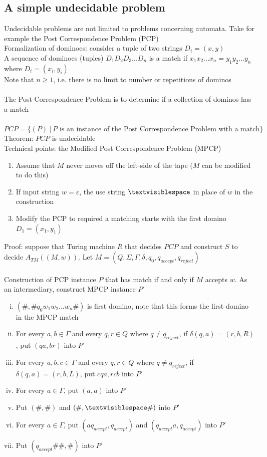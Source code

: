 \documentclass{article}
\newcommand{\tmblank}{\textvisiblespace}
\newcommand*{\<}{\langle}
\renewcommand*{\>}{\rangle}
\begin{document}
		\subsection{A simple undecidable problem}
			Undecidable problems are not limited to problems concerning automata. Take for example the Post Correspondence Problem (PCP) \\
			Formalization of dominoes: consider a tuple of two strings $D_i = (x, y)$ \\
			A sequence of dominoes (tuples) $D_1D_2D_3...D_n$ is a match if $x_1x_2...x_n = y_1y_2...y_n$ where $D_i = (x_i, y_i)$ \\
			Note that $n \geq 1$, i.e. there is no limit to number or repetitions of dominos \\
			\\
			The Post Correspondence Problem is to determine if a collection of dominos has a match \\
			\\
			$PCP = \{(P)\:|\:P\text{ is an instance of the Post Correspondence Problem with a match}\}$ \\
			Theorem: $PCP$ is undecidable \\
			Technical points: the Modified Post Correspondence Problem (MPCP) 
			\begin{enumerate}
				\item Assume that $M$ never moves off the left-side of the tape ($M$ can be modified to do this)
				\item If input string $w = \varepsilon$, the use string $\tmblank$ in place of $w$ in the construction
				\item Modify the PCP to required a matching starts with the first domino $D_1 = (x_1, y_1)$
				\end{enumerate}
			Proof: suppose that Turing machine $R$ that decides $PCP$ and construct $S$ to decide $A_{TM}((M, w))$. Let $M = (Q, \Sigma, \Gamma, \delta, q_0, q_{accept}, q_{reject})$ \\
			\\
			Construction of PCP instance $P$ that has match if and only if $M$ accepts $w$. As an intermediary, construct MPCP instance $P'$
			\begin{enumerate}[(i)]
				\item $(\#, \#q_0w_1w_2...w_n\#)$ is first domino, note that this forms the first domino in the MPCP match
				\item For every $a, b \in \Gamma$ and every $q, r \in Q$ where $q \neq q_{reject}$, if $\delta(q, a) = (r, b, R)$, put $(qa, br)$ into $P'$
				\item For every $a, b, c \in \Gamma$ and every $q, r \in Q$ where $q \neq q_{reject}$, if $\delta(q, a) = (r, b, L)$, put $cqa, rcb$ into $P'$
				\item For every $a \in \Gamma$, put $(a, a)$ into $P'$
				\item Put $(\#, \#)$ and $(\#, \tmblank\#)$ into $P'$
				\item For every $a \in \Gamma$, put $(aq_{accept}, q_{accept})$ and $(q_{accept}a, q_{accept})$ into $P'$
				\item Put $(q_{accept}\#\#, \#)$ into $P'$
				\end{enumerate}
\end{document}

